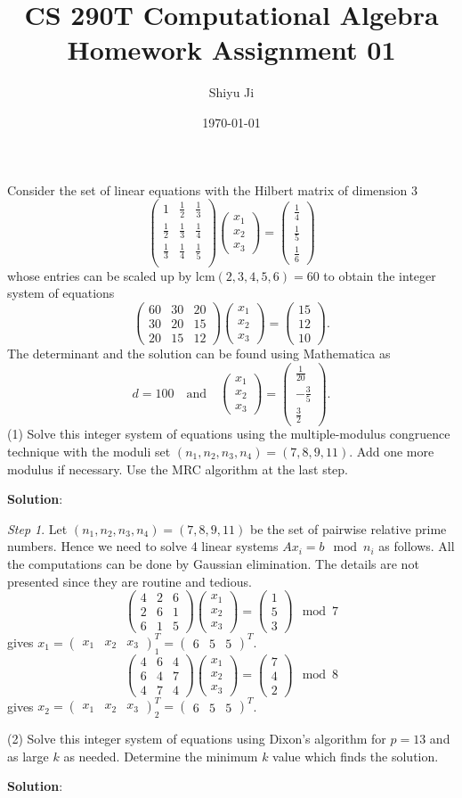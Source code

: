 \documentclass[12pt]{article}
\theoremstyle{plain}
\begin{document}
\title{CS 290T Computational Algebra Homework Assignment 01}
\author{Shiyu Ji}
\date{\today}
\maketitle

\newcommand{\m}[1]{\begin{pmatrix}#1\end{pmatrix}}
\newcommand{\rank}[1]{\operatorname{rank}(#1)}

Consider the set of linear equations with the Hilbert matrix of dimension 3
$$\m{1 & \frac{1}{2} & \frac{1}{3} \\
\frac{1}{2} & \frac{1}{3} & \frac{1}{4} \\
\frac{1}{3} & \frac{1}{4} & \frac{1}{5} \\}
\m{x_1 \\ x_2 \\ x_3}=
\m{\frac{1}{4} \\ \frac{1}{5} \\ \frac{1}{6}}$$
whose entries can be scaled up by $\mathrm{lcm}(2,3,4,5,6) = 60$ to obtain the integer system of equations
$$\m{60 & 30 & 20 \\
30 & 20 & 15 \\
20 & 15 & 12}
\m{x_1 \\ x_2 \\ x_3}=
\m{15 \\ 12 \\ 10}.$$
The determinant and the solution can be found using Mathematica as
$$d=100 \quad \mathrm{and}\quad 
\m{x_1 \\ x_2 \\ x_3}=
\m{\frac{1}{20} \\ -\frac{3}{5} \\ \frac{3}{2}}.$$
(1) Solve this integer system of equations using the multiple-modulus congruence technique with the moduli set $(n_1, n_2, n_3, n_4) = (7, 8, 9, 11)$. Add one more modulus if necessary. Use the MRC algorithm at the
last step.

{\bf Solution}:

\emph{Step 1}. Let $(n_1, n_2, n_3, n_4) = (7, 8, 9, 11)$ be the set of pairwise relative prime numbers. Hence we need to solve 4 linear systems $Ax_i = b \mod n_i$ as follows. All the computations can be done by Gaussian elimination. The details are not presented since they are routine and tedious.
$$\m{4 & 2 & 6 \\
2 & 6 & 1 \\
6 & 1 & 5}
\m{x_1 \\ x_2 \\ x_3}=
\m{1 \\ 5 \\ 3} \mod 7$$
gives $x_1 = \m{x_1 & x_2 & x_3}_1^T = \m{6 & 5 & 5}^T$.
$$\m{4 & 6 & 4 \\
6 & 4 & 7 \\
4 & 7 & 4}
\m{x_1 \\ x_2 \\ x_3}=
\m{7 \\ 4 \\ 2} \mod 8$$
gives $x_2 = \m{x_1 & x_2 & x_3}_2^T = \m{6 & 5 & 5}^T$.

(2) Solve this integer system of equations using Dixon’s algorithm for $p = 13$ and as large $k$ as needed. Determine the minimum $k$ value which
finds the solution.

{\bf Solution}:
\end{document}
